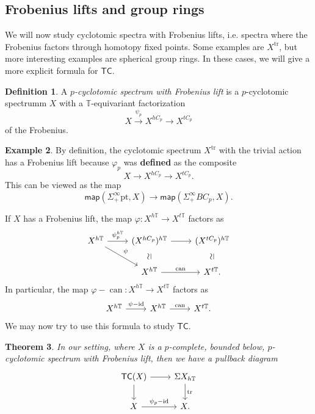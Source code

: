 \documentclass[10pt, oneside]{memoir}
\newtheorem{thm}{Theorem}[subsection]
\theoremstyle{definition}
\newtheorem{defn}[thm]{Definition}
\newtheorem{exm}[thm]{Example}
\theoremstyle{remark}
\theoremstyle{plain}
\theoremstyle{definition}
\theoremstyle{remark}
\newcommand{\T}{\mathbb{T}}
\newcommand{\mr}[1]{\mathrm{#1}}
\newcommand{\on}[1]{\operatorname{#1}}
\newcommand{\ms}[1]{\mathsf{#1}}
\newcommand{\1}{\mathbf{1}}
\newcommand{\2}{\mathbf{2}}
\newcommand{\3}{\mathbf{3}}
\newcommand{\pt}{\mr{pt}}
\newcommand{\TC}{\ms{TC}}
\begin{document}
\subsection{Frobenius lifts and group rings}%
\label{sub:Frobenius lifts and group rings}

We will now study cyclotomic spectra with Frobenius lifts, i.e. spectra where the Frobenius factors through homotopy fixed points. Some examples are $X^{\mr{tr}}$, but more interesting examples are spherical group rings. In these cases, we will give a more explicit formula for $\TC$.

\begin{defn}
    A \textit{$p$-cyclotomic spectrum with Frobenius lift} is a $p$-cyclotomic spectrumm $X$ with a $\T$-equivariant factorization
    \[ X \xrightarrow{\psi_p} X^{hC_p} \to X^{t C_p} \]
    of the Frobenius.
\end{defn}

\begin{exm}
    By definition, the cyclotomic spectrum $X^{\mr{tr}}$ with the trivial action has a Frobenius lift because $\varphi_p$ was \textbf{defined} as the composite
    \[ X \to X^{hC_p} \to X^{t C_p}. \]
    This can be viewed as the map
    \[ \ms{map}(\Sigma_+^{\infty} \pt, X) \to \ms{map}(\Sigma_+^{\infty} BC_p, X). \]
\end{exm}

If $X$ has a Frobenius lift, the map $\varphi \colon X^{h\T} \to X^{t\T}$ factors as
\begin{equation*}
\begin{tikzcd}
    X^{h\T} \ar{dr}{\psi} \ar{r}{\psi_p^{h\T}} & (X^{hC_p})^{h\T} \ar{r} & (X^{tC_p})^{h\T} \\
    & X^{h\T} \ar[phantom,u,sloped,"\simeq"] \ar{r}{\on{can}} & X^{t\T} \ar[phantom,u,sloped,"\simeq"].
\end{tikzcd}
\end{equation*}
In particular, the map $\varphi - \on{can} \colon X^{h\T} \to X^{t\T}$ factors as
\begin{equation*}
\begin{tikzcd}
    X^{h\T} \ar{r}{\psi - \mr{id}} & X^{h\T} \ar{r}{\on{can}} & X^{t\T}.
\end{tikzcd}
\end{equation*}
We may now try to use this formula to study $\TC$.

\begin{thm}
    In our setting, where $X$ is a $p$-complete, bounded below, $p$-cyclotomic spectrum with Frobenius lift, then we have a pullback diagram
    \begin{equation*}
    \begin{tikzcd}
        \TC(X) \ar{r} \ar{d} & \Sigma X_{h\T} \ar{d}{\on{tr}} \\
        X \ar{r}{\psi_p - \mr{id}} & X.
    \end{tikzcd}
    \end{equation*}
\end{thm}
\end{document}
